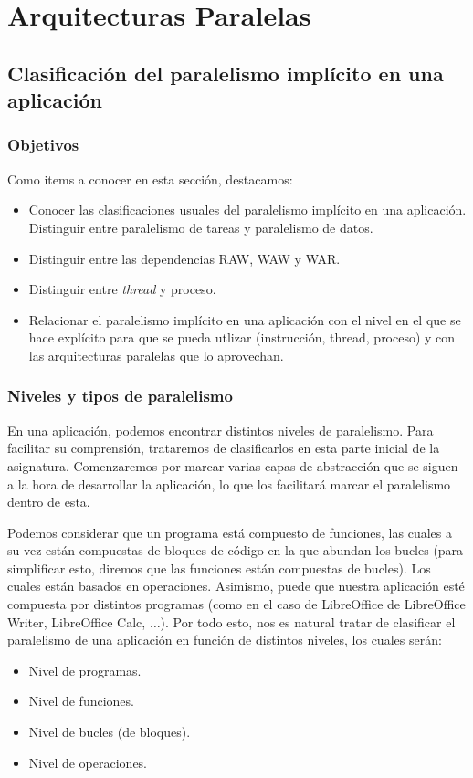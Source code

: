 \chapter{Arquitecturas Paralelas}

\section{Clasificación del paralelismo implícito en una aplicación}
\subsection{Objetivos}
Como items a conocer en esta sección, destacamos:
\begin{itemize}
    \item Conocer las clasificaciones usuales del paralelismo implícito en una aplicación. Distinguir entre paralelismo de tareas y paralelismo de datos.
    \item Distinguir entre las dependencias RAW, WAW y WAR.
    \item Distinguir entre \emph{thread} y proceso.
    \item Relacionar el paralelismo implícito en una aplicación con el nivel en el que se hace explícito para que se pueda utlizar (instrucción, thread, proceso) y con las arquitecturas paralelas que lo aprovechan.
\end{itemize}

\subsection{Niveles y tipos de paralelismo}
En una aplicación, podemos encontrar distintos niveles de paralelismo. Para facilitar su comprensión, trataremos de clasificarlos en esta parte inicial de la asignatura. Comenzaremos por marcar varias capas de abstracción que se siguen a la hora de desarrollar la aplicación, lo que los facilitará marcar el paralelismo dentro de esta.

Podemos considerar que un programa está compuesto de funciones, las cuales a su vez están compuestas de bloques de código en la que abundan los bucles (para simplificar esto, diremos que las funciones están compuestas de bucles). Los cuales están basados en operaciones. Asimismo, puede que nuestra aplicación esté compuesta por distintos programas (como en el caso de LibreOffice de LibreOffice Writer, LibreOffice Calc, $\ldots$). Por todo esto, nos es natural tratar de clasificar el paralelismo de una aplicación en función de distintos niveles, los cuales serán:
\begin{itemize}
    \item Nivel de programas.
    \item Nivel de funciones.
    \item Nivel de bucles (de bloques).
    \item Nivel de operaciones.
\end{itemize}


